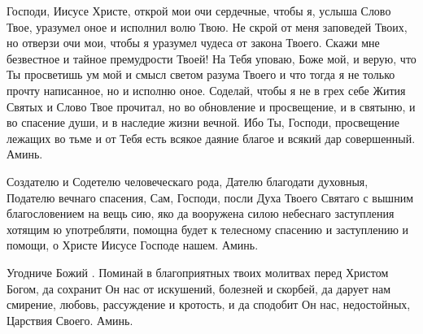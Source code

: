 \mychapterending


\begin{mymulticols}




Господи, Иисусе Христе, открой мои очи сердечные, чтобы я, услыша Слово Твое, уразумел оное и исполнил волю Твою. Не скрой от меня заповедей Твоих, но отверзи очи мои, чтобы я уразумел чудеса от закона Твоего. Скажи мне безвестное и тайное премудрости Твоей! На Тебя уповаю, Боже мой, и верую, что Ты просветишь ум мой и смысл светом разума Твоего и что тогда я не только прочту написанное, но и исполню оное. Соделай, чтобы я не в грех себе Жития Святых и Слово Твое прочитал, но во обновление и просвещение, и в святыню, и во спасение души, и в наследие жизни вечной. Ибо Ты, Господи, просвещение лежащих во тьме и от Тебя есть всякое даяние благое и всякий дар совершенный. Аминь.

\end{mymulticols}

\mychapterending


\begin{mymulticols}




Создателю и Содетелю человеческаго рода, Дателю благодати духовныя, Подателю вечнаго спасения, Сам, Господи, посли Духа Твоего Святаго с вышним благословением на вещь сию, яко да вооружена силою небеснаго заступления хотящим ю употребляти, помощна будет к телесному спасению и заступлению и помощи, о Христе Иисусе Господе нашем. Аминь.






\end{mymulticols}

\mychapterending


\begin{mymulticols}



Угодниче Божий . Поминай в благоприятных твоих молитвах перед Христом Богом, да сохранит Он нас от искушений, болезней и скорбей, да дарует нам смирение, любовь, рассуждение и кротость, и да сподобит Он нас, недостойных, Царствия Своего. Аминь.




\end{mymulticols}

